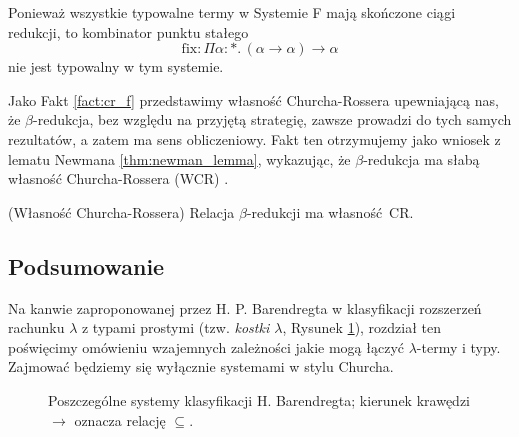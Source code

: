 \begin{wniosek*}
  Ponieważ wszystkie typowalne termy w Systemie F mają skończone ciągi redukcji, to kombinator punktu stałego
  \[ \mathrm{fix} : \Pi \alpha:*.\,(\alpha\to\alpha)\to \alpha \]
nie jest typowalny w tym systemie.
\end{wniosek*}

Jako Fakt \ref{fact:cr_f} przedstawimy własność Churcha-Rossera upewniającą nas, że \(\beta\)-redukcja, bez względu na przyjętą strategię, zawsze prowadzi do tych samych rezultatów, a zatem ma sens obliczeniowy. Fakt ten otrzymujemy jako wniosek z lematu Newmana \ref{thm:newman_lemma}, wykazując, że \(\beta\)-redukcja ma słabą własność Churcha-Rossera (WCR) \cite[Twierdzenie 11.2.12]{Urzyczyn2006}.

\begin{fakt}(Własność Churcha-Rossera)\label{fact:cr_f}
  Relacja \(\beta\)-redukcji ma własność CR.
\end{fakt}


\subsection{Podsumowanie}
Na kanwie zaproponowanej przez H. P. Barendregta w \cite[Rozdział 5]{Barendregt_1992} klasyfikacji rozszerzeń rachunku \(\lambda\) z typami prostymi (tzw. \emph{kostki \(\lambda\)}, Rysunek \ref{fig:lambda-cube}), rozdział ten poświęcimy omówieniu wzajemnych zależności jakie mogą łączyć \(\lambda\)-termy i typy. Zajmować będziemy się wyłącznie systemami w stylu Churcha.

\begin{figure}[!h]
  \centering
  \caption{Poszczególne systemy klasyfikacji H. Barendregta; kierunek krawędzi \(\to\)  oznacza relację \(\subseteq\).}\label{fig:lambda-cube}
\end{figure}


